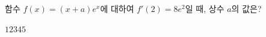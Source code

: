 함수 $f(x)=(x+a)e^x$에 대하여 $f'(2)=8e^2$일 때, 상수 $a$의 값은?
\begin{choices32}{$1$}{$2$}{$3$}{$4$}{$5$}\end{choices32}
